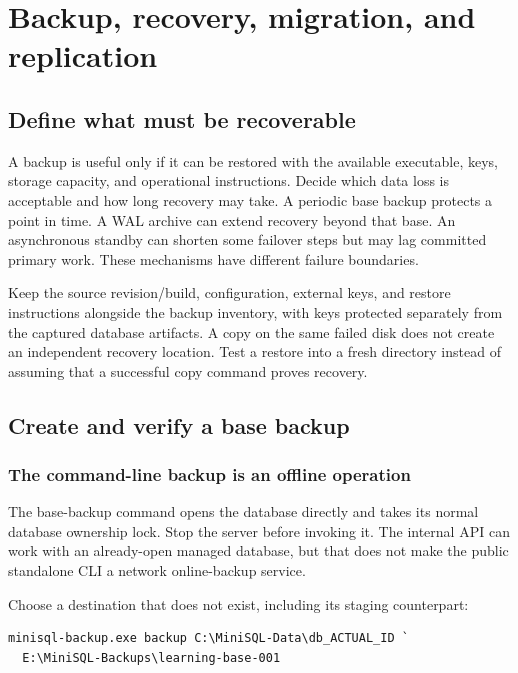 \chapter{Backup, recovery, migration, and replication}
\label{ops:recovery}

\section{Define what must be recoverable}

A backup is useful only if it can be restored with the available executable,
keys, storage capacity, and operational instructions. Decide which data loss
is acceptable and how long recovery may take. A periodic base backup protects
a point in time. A WAL archive can extend recovery beyond that base. An
asynchronous standby can shorten some failover steps but may lag committed
primary work. These mechanisms have different failure boundaries.

Keep the source revision/build, configuration, external keys, and restore
instructions alongside the backup inventory, with keys protected separately
from the captured database artifacts. A copy on the same failed disk does
not create an independent recovery location. Test a restore into a fresh
directory instead of assuming that a successful copy command proves recovery.



\section{Create and verify a base backup}

\subsection{The command-line backup is an offline operation}

The base-backup command opens the database directly and takes its normal
database ownership lock. Stop the server before invoking it. The internal
 API can work with an already-open managed database, but that
does not make the public standalone CLI a network online-backup service.

Choose a destination that does not exist, including its staging counterpart:

\begin{lstlisting}
minisql-backup.exe backup C:\MiniSQL-Data\db_ACTUAL_ID `
  E:\MiniSQL-Backups\learning-base-001
\end{lstlisting}


